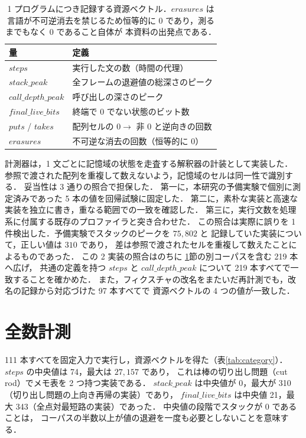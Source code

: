 \documentclass[a4paper,11pt]{jsarticle}
\begin{document}
\begin{table}[tb]
  \centering
  \caption{1 プログラムにつき記録する資源ベクトル．$\mathit{erasures}$ は
    言語が不可逆消去を禁じるため恒等的に 0 であり，測るまでもなく 0 であること自体が
    本資料の出発点である．}
  \label{tab:metrics}
  \small
  \setlength{\tabcolsep}{3pt}
  \begin{tabular}{l l}
    \toprule
    量 & 定義 \\
    \midrule
    $\mathit{steps}$ & 実行した文の数（時間の代理） \\
    $\mathit{stack\_peak}$ & 全フレームの退避値の総深さのピーク \\
    $\mathit{call\_depth\_peak}$ & 呼び出しの深さのピーク \\
    $\mathit{final\_live\_bits}$ & 終端で 0 でない状態のビット数 \\
    $\mathit{puts}$ / $\mathit{takes}$ & 配列セルの $0 \to$ 非 $0$ と逆向きの回数 \\
    $\mathit{erasures}$ & 不可逆な消去の回数（恒等的に 0） \\
    \bottomrule
  \end{tabular}
\end{table}

計測器は，1 文ごとに記憶域の状態を走査する解釈器の計装として実装した．
参照で渡された配列を重複して数えないよう，記憶域のセルは同一性で識別する．
妥当性は 3 通りの照合で担保した．
第一に，本研究の予備実験で個別に測定済みであった 5 本の値を回帰試験に固定した．
第二に，素朴な実装と高速な実装を独立に書き，重なる範囲での一致を確認した．
第三に，実行文数を処理系に付属する既存のプロファイラと突き合わせた．
この照合は実際に誤りを 1 件検出した．予備実験でスタックのピークを $75{,}802$ と
記録していた実装について，正しい値は $310$ であり，
差は参照で渡されたセルを重複して数えたことによるものであった．
この 2 実装の照合はのちに \ref{sec:census}節の別コーパスを含む 219 本へ広げ，
共通の定義を持つ $\mathit{steps}$ と $\mathit{call\_depth\_peak}$ について
219 本すべてで一致することを確かめた．
また，フィクスチャの改名をまたいだ再計測でも，改名の記録から対応づけた 97 本すべてで
資源ベクトルの 4 つの値が一致した．

\section{全数計測}\label{sec:census}

111 本すべてを固定入力で実行し，資源ベクトルを得た（表\ref{tab:category}）．
$\mathit{steps}$ の中央値は 74，最大は $27{,}157$ であり，
これは棒の切り出し問題（cut rod）でメモ表を 2 つ持つ実装である．
$\mathit{stack\_peak}$ は中央値が 0，最大が 310（切り出し問題の上向き再帰の実装）であり，
$\mathit{final\_live\_bits}$ は中央値 21，最大 343（全点対最短路の実装）であった．
中央値の段階でスタックが 0 であることは，
コーパスの半数以上が値の退避を一度も必要としないことを意味する．
\end{document}
